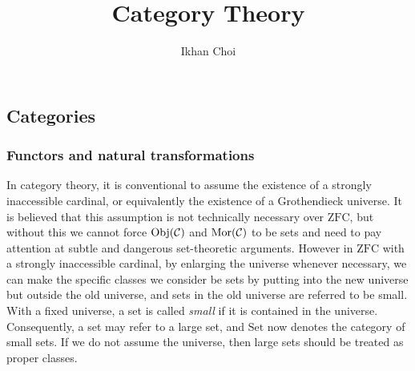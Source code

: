 \documentclass{../../large}
\begin{document}
\title{Category Theory}
\author{Ikhan Choi}
\maketitle
\tableofcontents


\part{}

\chapter{Categories}


\section{Functors and natural transformations}


\begin{prb}
In category theory, it is conventional to assume the existence of a strongly inaccessible cardinal, or equivalently the existence of a Grothendieck universe.
It is believed that this assumption is not technically necessary over $\mathrm{ZFC}$, but without this we cannot force $\operatorname{Obj}(\mathcal{C})$ and $\operatorname{Mor}(\mathcal{C})$ to be sets and need to pay attention at subtle and dangerous set-theoretic arguments.
However in $\mathrm{ZFC}$ with a strongly inaccessible cardinal, by enlarging the universe whenever necessary, we can make the specific classes we consider be sets by putting into the new universe but outside the old universe, and sets in the old universe are referred to be small.
With a fixed universe, a set is called \emph{small} if it is contained in the universe.
Consequently, a set may refer to a large set, and $\mathrm{Set}$ now denotes the category of small sets.
If we do not assume the universe, then large sets should be treated as proper classes.
\end{prb}
\end{document}
